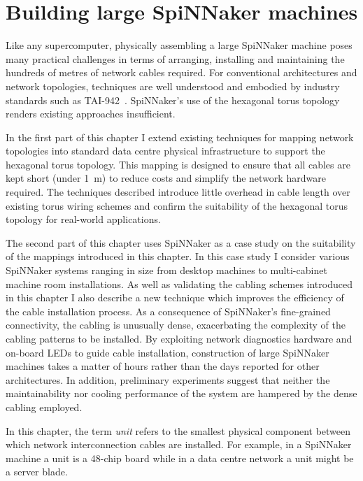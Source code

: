 \chapter{Building large SpiNNaker machines}
	
	\label{sec:building}
	
	Like any supercomputer, physically assembling a large SpiNNaker machine
	poses many practical challenges in terms of arranging, installing and
	maintaining the hundreds of metres of network cables required.  For
	conventional architectures and network topologies, techniques are well
	understood and embodied by industry standards such as TAI-942~\cite{tia2006}.
	SpiNNaker's use of the hexagonal torus topology renders existing approaches
	insufficient.
	
	In the first part of this chapter I extend existing techniques for mapping
	network topologies into standard data centre physical infrastructure to
	support the hexagonal torus topology. This mapping is designed to ensure that
	all cables are kept short (under \SI{1}{\meter}) to reduce costs and
	simplify the network hardware required. The techniques described introduce
	little overhead in cable length over existing torus wiring schemes
	and confirm the suitability of the hexagonal torus topology for real-world
	applications.
	
	The second part of this chapter uses SpiNNaker as a case study on the
	suitability of the mappings introduced in this chapter.  In this case study I
	consider various SpiNNaker systems ranging in size from desktop machines to
	multi-cabinet machine room installations. As well as validating the cabling
	schemes introduced in this chapter I also describe a new technique which
	improves the efficiency of the cable installation process.  As a consequence
	of SpiNNaker's fine-grained connectivity, the cabling is unusually dense,
	exacerbating the complexity of the cabling patterns to be installed. By
	exploiting network diagnostics hardware and on-board LEDs to guide cable
	installation, construction of large SpiNNaker machines takes a matter of
	hours rather than the days reported for other architectures. In addition,
	preliminary experiments suggest that neither the maintainability nor cooling
	performance of the system are hampered by the dense cabling employed.
	
	In this chapter, the term \emph{unit} refers to the smallest physical
	component between which network interconnection cables are installed. For
	example, in a SpiNNaker machine a unit is a 48-chip board while in a data
	centre network a unit might be a server blade.
	
